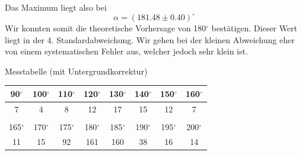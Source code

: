 Das Maximum liegt also bei
$$\alpha = (181.48 \pm 0.40)^\circ$$
Wir konnten somit die theoretische Vorhersage von 180$^\circ$ bestätigen. Dieser Wert liegt in der 4. Standardabweichung. Wir gehen bei der kleinen Abweichung eher von einem systematischen Fehler aus, welcher jedoch sehr klein ist.

Messtabelle (mit Untergrundkorrektur)

\begin{center}
\begin{tabular}{c c c c c c c c}
90$^\circ$ & 100$^\circ$ & 110$^\circ$ & 120$^\circ$ & 130$^\circ$ & 140$^\circ$ & 150$^\circ$ & 160$^\circ$\\ \hline
7 & 4 & 8 & 12 & 17 & 15 & 12 & 7 \\
& & & & & & & \\
165$^\circ$ & 170$^\circ$ & 175$^\circ$ & 180$^\circ$ & 185$^\circ$ & 190$^\circ$ & 195$^\circ$ & 200$^\circ$\\ \hline
11 & 15 & 92 & 161 & 160 & 38 & 16 & 14\\
\end{tabular}
\end{center}

























